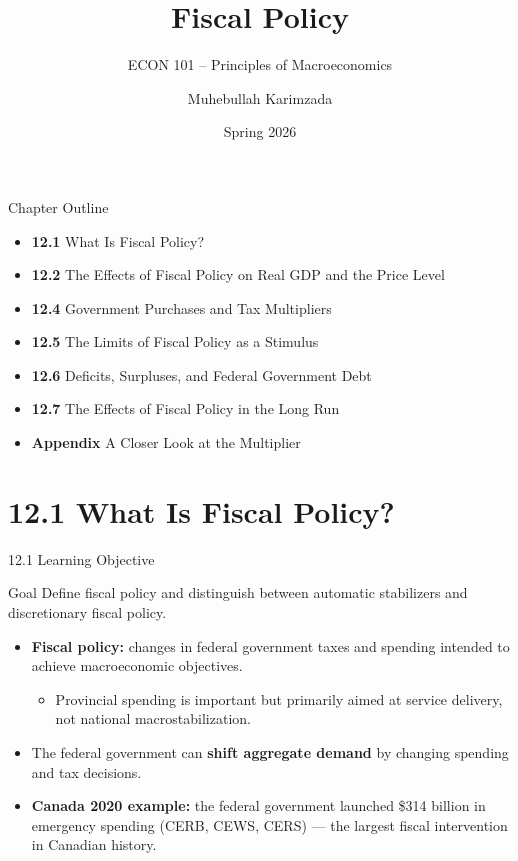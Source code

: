 \documentclass[aspectratio=169]{beamer}
\title{\textbf{Fiscal Policy}}
\subtitle{{\large ECON 101 -- Principles of Macroeconomics}}
\author{Muhebullah Karimzada}
\date{Spring 2026}
\begin{document}

\begin{frame}[plain]
  \titlepage
\end{frame}

\begin{frame}{Chapter Outline}
\transfade
\begin{itemize}[<+->]
  \item \textbf{12.1} What Is Fiscal Policy?
  \item \textbf{12.2} The Effects of Fiscal Policy on Real GDP and the Price Level
  \item \textbf{12.4} Government Purchases and Tax Multipliers
  \item \textbf{12.5} The Limits of Fiscal Policy as a Stimulus
  \item \textbf{12.6} Deficits, Surpluses, and Federal Government Debt
  \item \textbf{12.7} The Effects of Fiscal Policy in the Long Run
  \item \textbf{Appendix} A Closer Look at the Multiplier
\end{itemize}
\end{frame}

\section{12.1 What Is Fiscal Policy?}

\begin{frame}{12.1 Learning Objective}
\transfade
\begin{block}{Goal}
Define fiscal policy and distinguish between automatic stabilizers and discretionary fiscal policy.
\end{block}
\begin{itemize}[<+->]
  \item \textbf{Fiscal policy:} changes in \alert{federal government taxes and spending} intended to achieve macroeconomic objectives.
  \begin{itemize}[<+->]
    \item Provincial spending is important but primarily aimed at service delivery, not national macrostabilization.
  \end{itemize}
  \item The federal government can \textbf{shift aggregate demand} by changing spending and tax decisions.
  \item \textbf{Canada 2020 example:} the federal government launched \$314 billion in emergency spending (CERB, CEWS, CERS) --- the largest fiscal intervention in Canadian history.
\end{itemize}
\end{frame}
\end{document}
